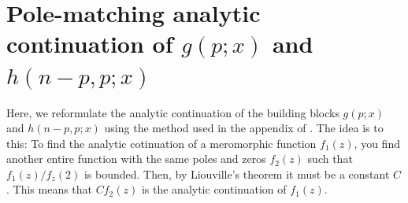 \documentclass[11pt]{article}
\newcommand{\eps}{\varepsilon}
\begin{document}



  \section*{Pole-matching analytic continuation of $g(p;x)$ and $h(n-p,p;x)$}

  Here, we reformulate the analytic continuation of the building blocks $g(p;x)$
  and $h(n-p,p;x)$ using the method used in the appendix of 
  \cite{Lashkari_2016}.
  The idea is to this: To find the analytic cotinuation of a meromorphic function
  $f_{1}(z)$, you find another entire function with the same poles and zeros
  $f_{2}(z)$ such that $f_{1}(z)/f_{z}(2)$ is bounded. Then, by Liouville's
  theorem it must be a constant $C$. This means that $C f_{2}(z)$ is the analytic
  continuation of $f_{1}(z)$.
\end{document}
